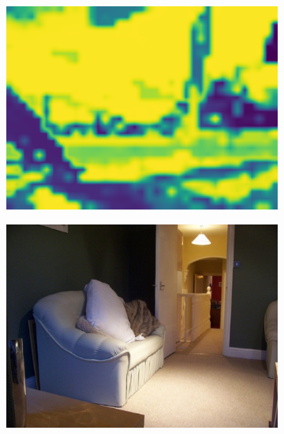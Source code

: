 \begin{figure}[t]
\begin{subfigure}{0.3\textwidth}
    \includegraphics[width=\linewidth]{figures/experiments/entropymaps/er/13/class_entropywithoutcb.pdf}
\end{subfigure}
\begin{subfigure}{0.3\textwidth}
    \centering
    \includegraphics[width=\linewidth]{figures/experiments/entropymaps/finetuned/10/0010.jpg}
\end{subfigure}
\begin{subfigure}{0.3\textwidth}
    \centering

\end{subfigure}
\end{figure}
